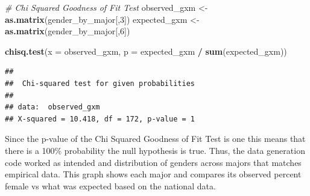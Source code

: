 \documentclass[
  twocolumn]{article}
\newenvironment{Shaded}{\begin{snugshade}}{\end{snugshade}}
\newcommand{\AttributeTok}[1]{\textcolor[rgb]{0.13,0.29,0.53}{#1}}
\newcommand{\CommentTok}[1]{\textcolor[rgb]{0.56,0.35,0.01}{\textit{#1}}}
\newcommand{\DecValTok}[1]{\textcolor[rgb]{0.00,0.00,0.81}{#1}}
\newcommand{\FunctionTok}[1]{\textcolor[rgb]{0.13,0.29,0.53}{\textbf{#1}}}
\newcommand{\NormalTok}[1]{#1}
\newcommand{\OtherTok}[1]{\textcolor[rgb]{0.56,0.35,0.01}{#1}}
\newcommand{\SpecialCharTok}[1]{\textcolor[rgb]{0.81,0.36,0.00}{\textbf{#1}}}
\begin{document}
\begin{Shaded}
\begin{Highlighting}[]
\CommentTok{\# Chi Squared Goodness of Fit Test}
\NormalTok{observed\_gxm }\OtherTok{\textless{}{-}} \FunctionTok{as.matrix}\NormalTok{(gender\_by\_major[,}\DecValTok{3}\NormalTok{])}
\NormalTok{expected\_gxm }\OtherTok{\textless{}{-}} \FunctionTok{as.matrix}\NormalTok{(gender\_by\_major[,}\DecValTok{6}\NormalTok{])}

\FunctionTok{chisq.test}\NormalTok{(}\AttributeTok{x =}\NormalTok{ observed\_gxm, }\AttributeTok{p =}\NormalTok{ expected\_gxm }\SpecialCharTok{/} \FunctionTok{sum}\NormalTok{(expected\_gxm))}
\end{Highlighting}
\end{Shaded}

\begin{verbatim}
## 
##  Chi-squared test for given probabilities
## 
## data:  observed_gxm
## X-squared = 10.418, df = 172, p-value = 1
\end{verbatim}

Since the p-value of the Chi Squared Goodness of Fit Test is one this
means that there is a 100\% probability the null hypothesis is true.
Thus, the data generation code worked as intended and distribution of
genders across majors that matches empirical data. This graph shows each
major and compares its observed percent female vs what was expected
based on the national data.
\end{document}
